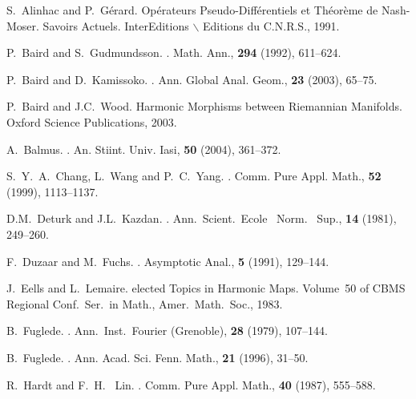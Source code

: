 \documentclass[12pt]{amsart}
\theoremstyle{plain}
\theoremstyle{definition}
\begin{document}
\begin{thebibliography}{99999}

S.~Alinhac and P.~G\'{e}rard.
\newblock Op{\'e}rateurs Pseudo-Diff{\'e}rentiels et Th{\'e}or{\`e}me de {N}ash-{M}oser.
\newblock Savoirs Actuels. InterEditions $\backslash$ Editions du C.N.R.S., 1991.

P.~Baird and S.~Gudmundsson.
.
\newblock  Math. Ann., {\bf 294} (1992), 611--624.

P.~Baird and D.~Kamissoko.
.
\newblock Ann. Global Anal. Geom., {\bf 23} (2003), 65--75.

P.~Baird and J.C.~Wood.
\newblock Harmonic Morphisms between Riemannian Manifolds.
\newblock Oxford Science Publications, 2003.

A.~Balmus.
.
\newblock An. Stiint. Univ. Iasi, {\bf 50} (2004), 361--372.

S.~Y.~A.~Chang, L.~Wang and P.~C.~Yang.
.
\newblock Comm. Pure Appl. Math., {\bf 52} (1999), 1113--1137.

D.M.~Deturk and J.L.~Kazdan.
.
\newblock Ann.\ Scient.\ Ecole \ Norm. \ Sup., {\bf 14} (1981), 249--260.

F.~Duzaar and M.~Fuchs.
.
\newblock Asymptotic Anal., {\bf 5} (1991), 129--144.

J.~Eells and L.~Lemaire.
elected Topics in Harmonic Maps.
\newblock Volume~50 of CBMS Regional Conf.\ Ser.\ in Math.,
\newblock Amer.\ Math.\ Soc., 1983.

B.~Fuglede.
.
\newblock Ann.\ Inst.\ Fourier (Grenoble), {\bf 28} (1979), 107--144.

B.~Fuglede.
.
\newblock Ann. Acad. Sci. Fenn. Math., {\bf 21} (1996), 31--50.

R.~Hardt and F.~H.~ Lin.
.
\newblock Comm. Pure Appl. Math., {\bf 40} (1987), 555--588.


\end{thebibliography}
\end{document}
